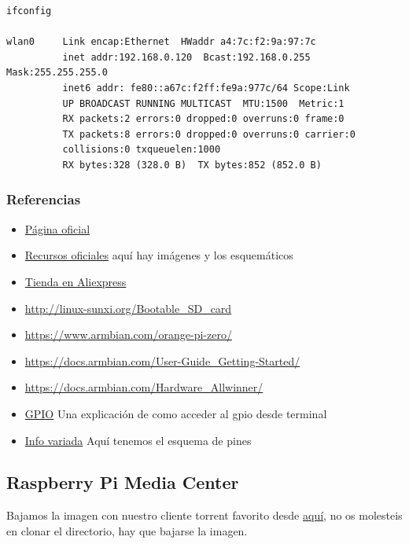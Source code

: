 \documentclass[12pt,spanish,]{scrartcl}
\providecommand{\tightlist}{%
  \setlength{\itemsep}{0pt}\setlength{\parskip}{0pt}}
\begin{document}
\begin{verbatim}
ifconfig

wlan0     Link encap:Ethernet  HWaddr a4:7c:f2:9a:97:7c
          inet addr:192.168.0.120  Bcast:192.168.0.255  Mask:255.255.255.0
          inet6 addr: fe80::a67c:f2ff:fe9a:977c/64 Scope:Link
          UP BROADCAST RUNNING MULTICAST  MTU:1500  Metric:1
          RX packets:2 errors:0 dropped:0 overruns:0 frame:0
          TX packets:8 errors:0 dropped:0 overruns:0 carrier:0
          collisions:0 txqueuelen:1000
          RX bytes:328 (328.0 B)  TX bytes:852 (852.0 B)
\end{verbatim}

\hypertarget{referencias-1}{%
\subsubsection{Referencias}\label{referencias-1}}

\begin{itemize}
\tightlist
\item
  \href{http://www.orangepi.org/}{Página oficial}
\item
  \href{http://www.orangepi.org/downloadresources/}{Recursos oficiales}
  aquí hay imágenes y los esquemáticos
\item
  \href{https://www.aliexpress.com/store/1553371?spm=2114.8147860.0.0.F1q43C}{Tienda
  en Aliexpress}
\item
  \url{http://linux-sunxi.org/Bootable_SD_card}
\item
  \url{https://www.armbian.com/orange-pi-zero/}
\item
  \url{https://docs.armbian.com/User-Guide_Getting-Started/}
\item
  \url{https://docs.armbian.com/Hardware_Allwinner/}
\item
  \href{https://linux-sunxi.org/GPIO}{GPIO} Una explicación de como
  acceder al gpio desde terminal
\item
  \href{https://linux-sunxi.org/Orange_Pi_Zero}{Info variada} Aquí
  tenemos el esquema de pines
\end{itemize}

\hypertarget{raspberry-pi-media-center}{%
\subsection{Raspberry Pi Media Center}\label{raspberry-pi-media-center}}

Bajamos la imagen con nuestro cliente torrent favorito desde
\href{https://github.com/aikoncwd/aikoncwd-rpi-mediacenter}{aquí}, no os
molesteis en clonar el directorio, hay que bajarse la imagen.
\end{document}
